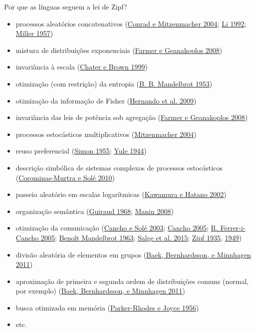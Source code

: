 \documentclass[
  ignorenonframetext,
  aspectratio=169]{beamer}
\providecommand{\tightlist}{%
  \setlength{\itemsep}{0pt}\setlength{\parskip}{0pt}}
\begin{document}
\begin{frame}[allowframebreaks]{Por que as línguas seguem a lei de
Zipf?}
\begin{itemize}
\tightlist
\item
  processos aleatórios concatenativos
  (\protect\hyperlink{ref-conrad2004power}{Conrad e Mitzenmacher 2004};
  \protect\hyperlink{ref-li1992random}{Li 1992};
  \protect\hyperlink{ref-miller1957some}{Miller 1957})
\item
  mistura de distribuições exponenciais
  (\protect\hyperlink{ref-farmer2008power}{Farmer e Geanakoplos 2008})
\item
  invariância à escala (\protect\hyperlink{ref-chater1999scale}{Chater e
  Brown 1999})
\item
  otimização (com restrição) da entropia
  (\protect\hyperlink{ref-mandelbrot1953}{B. B. Mandelbrot 1953})
\item
  otimização da informação de Fisher
  (\protect\hyperlink{ref-hernando2009zipf}{Hernando et al. 2009})
\item
  invariância das leis de potência sob agregação
  (\protect\hyperlink{ref-farmer2008power}{Farmer e Geanakoplos 2008})
\item
  processos estocásticos multiplicativos
  (\protect\hyperlink{ref-mitzenmacher2004brief}{Mitzenmacher 2004})
\item
  reuso preferencial (\protect\hyperlink{ref-simon1955class}{Simon
  1955}; \protect\hyperlink{ref-yule1944statistical}{Yule 1944})
\item
  descrição simbólica de sistemas complexos de processos estocásticos
  (\protect\hyperlink{ref-corominas2010universality}{Corominas-Murtra e
  Solé 2010})
\item
  passeio aleatório em escalas logarítmicas
  (\protect\hyperlink{ref-kawamura2002universality}{Kawamura e Hatano
  2002})
\item
  organização semântica
  (\protect\hyperlink{ref-guiraud1968semic}{Guiraud 1968};
  \protect\hyperlink{ref-manin2008zipf}{Manin 2008})
\item
  otimização da comunicação (\protect\hyperlink{ref-cancho2003}{Cancho e
  Solé 2003}; \protect\hyperlink{ref-cancho2005decoding}{Cancho 2005};
  \protect\hyperlink{ref-cancho2005hidden}{R. Ferrer-i-Cancho 2005};
  \protect\hyperlink{ref-mandelbrot1963}{Benoît Mandelbrot 1963};
  \protect\hyperlink{ref-salge2015zipf}{Salge et al. 2015};
  \protect\hyperlink{ref-zipf1935}{Zipf 1935},
  \protect\hyperlink{ref-zipf1949}{1949})
\item
  divisão aleatória de elementos em grupos
  (\protect\hyperlink{ref-baek2011zipf}{Baek, Bernhardsson, e Minnhagen
  2011})
\item
  aproximação de primeira e segunda ordem de distribuições comuns
  (normal, por exemplo) (\protect\hyperlink{ref-baek2011zipf}{Baek,
  Bernhardsson, e Minnhagen 2011})
\item
  busca otimizada em memória
  (\protect\hyperlink{ref-parker1956theory}{Parker-Rhodes e Joyce 1956})
\item
  etc.
\end{itemize}


\end{frame}
\end{document}
